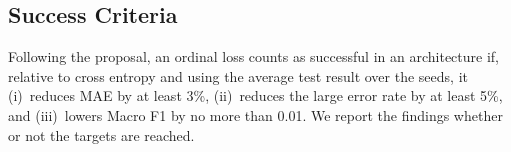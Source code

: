 \subsection{Success Criteria}
\label{sec:criteria}
Following the proposal, an ordinal loss counts as successful in an architecture if, relative to cross entropy and using the average test result over the seeds, it (i)~reduces MAE by at least 3\%, (ii)~reduces the large error rate by at least 5\%, and (iii)~lowers Macro F1 by no more than 0.01. We report the findings whether or not the targets are reached.
